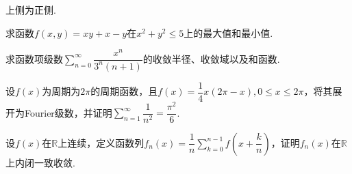 \documentclass[UTF8,14pt,normal]{ctexart}
\begin{document}
    \noindent 上侧为正侧.\vspace{1em}
    
    求函数$f(x, y)=xy+x-y$在$x^2+y^2\leq 5$上的最大值和最小值.\vspace{1em}
    
    求函数项级数$\displaystyle\sum_{n=0}^\infty\dfrac{x^n}{3^n(n+1)}$的收敛半径、收敛域以及和函数.\vspace{0.5em}
    
    设$f(x)$为周期为$2\pi$的周期函数，且$f(x) = \dfrac{1}{4}x(2\pi-x), 0\leq x\leq 2\pi$，将其展开为Fourier级数，并证明$\displaystyle\sum_{n=1}^\infty\dfrac{1}{n^2}=\dfrac{\pi^2}{6}$.
    
    设$f(x)$在$\mathbb{R}$上连续，定义函数列$f_n(x)=\dfrac{1}{n}\displaystyle\sum_{k=0}^{n-1}f\left(x+\dfrac{k}{n}\right)$，证明$f_n(x)$在$\mathbb{R}$上内闭一致收敛.
    
\end{document}
